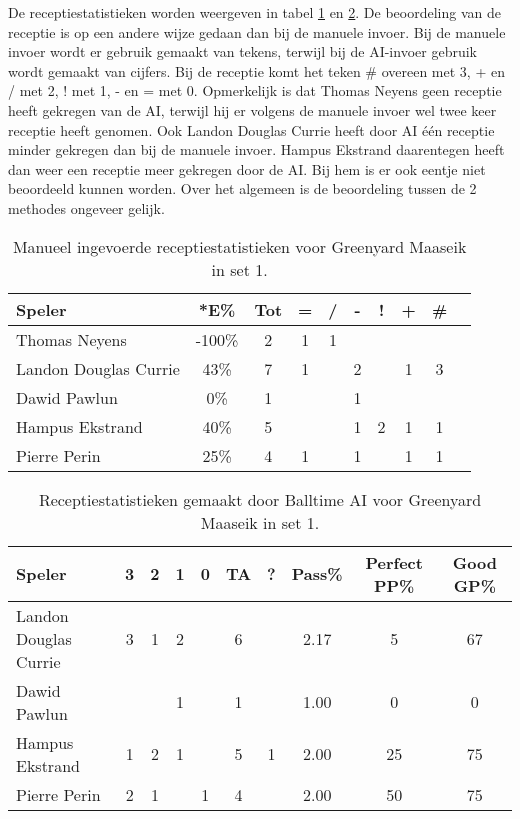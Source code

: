 De receptiestatistieken worden weergeven in tabel \ref{tab:PL3ReceiveMaaseikMan1} en  \ref{tab:PL3ReceiveMaaseikAI1}.
De beoordeling van de receptie is op een andere wijze gedaan dan bij de manuele invoer. Bij de manuele invoer wordt er gebruik gemaakt van tekens, terwijl bij de AI-invoer gebruik wordt gemaakt van cijfers. Bij de receptie komt het teken \# overeen met 3, + en / met 2, ! met 1, - en = met 0.
Opmerkelijk is dat Thomas Neyens geen receptie heeft gekregen van de AI, terwijl hij er volgens de manuele invoer wel twee keer receptie heeft genomen. Ook Landon Douglas Currie heeft door AI één receptie minder gekregen dan bij de manuele invoer. Hampus Ekstrand daarentegen heeft dan weer een receptie meer gekregen door de AI. Bij hem is er ook eentje niet beoordeeld kunnen worden. Over het algemeen is de beoordeling tussen de 2 methodes ongeveer gelijk.

\begin{table}[ht!]
    \centering
    \scriptsize
    \begin{tabular}{|l|c|c|c|c|c|c|c|c|c|} \hline
        \textbf{Speler} & *E\% & Tot & = & / & - & ! & + & \# \\ \hline
        Thomas Neyens & -100\% & 2 & 1 & 1 &  &  & & \\
        Landon Douglas Currie & 43\% & 7 & 1 &  & 2 & & 1 & 3 \\ 
        Dawid Pawlun & 0\% & 1 &  &  & 1 &  &  & \\ 
        Hampus Ekstrand & 40\% & 5 &  &  & 1 & 2 & 1 & 1 \\ 
        Pierre Perin & 25\% & 4 & 1 &  & 1 & & 1 & 1 \\ \hline
    \end{tabular}
    \caption[Manueel ingevoerde receptiestatistieken voor Greenyard Maaseik in set 1]{\label{tab:PL3ReceiveMaaseikMan1}Manueel ingevoerde receptiestatistieken voor Greenyard Maaseik in set 1.}
\end{table}

\begin{table}[ht!]
  \centering
  \scriptsize
    \begin{tabular}{|l|c|c|c|c|c|c|c|c|c|} \hline
    \textbf{Speler} & 3 & 2 & 1 & 0 & TA & ? & Pass\% & Perfect PP\% & Good GP\% \\ \hline
    Landon Douglas Currie & 3 & 1 & 2 &   & 6 &  & 2.17 & 5 & 67 \\
    Dawid Pawlun &  &  & 1 &  & 1 &  & 1.00 & 0 & 0 \\
    Hampus Ekstrand & 1 & 2 & 1 & & 5 & 1 & 2.00 & 25 & 75 \\
    Pierre Perin & 2 & 1 &  & 1 & 4 & & 2.00 & 50 & 75 \\  \hline
  \end{tabular}
  \caption[Receptiestatistieken gemaakt door Balltime AI voor Greenyard Maaseik in set 1]{\label{tab:PL3ReceiveMaaseikAI1}Receptiestatistieken gemaakt door Balltime AI voor Greenyard Maaseik in set 1.}
\end{table}

